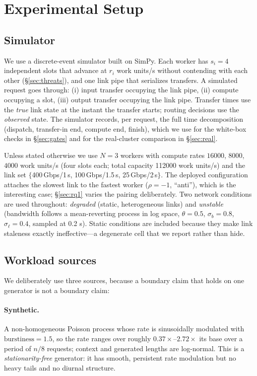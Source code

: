 \section{Experimental Setup}
\label{sec:setup}

\subsection{Simulator}
We use a discrete-event simulator built on SimPy. Each worker has $s_i=4$ independent slots that
advance at $r_i$ work units/s without contending with each other (\S\ref{sec:threats}), and one
link pipe that serializes transfers. A simulated request goes through: (i) input transfer
occupying the link pipe, (ii) compute occupying a slot, (iii) output transfer occupying the link
pipe. Transfer times use the \emph{true} link state at the instant the transfer starts; routing
decisions use the \emph{observed} state. The simulator records, per request, the full time
decomposition (dispatch, transfer-in end, compute end, finish), which we use for the white-box
checks in \S\ref{sec:gates} and for the real-cluster comparison in \S\ref{sec:real}.

Unless stated otherwise we use $N=3$ workers with compute rates $16000$, $8000$, $4000$ work
units/s (four slots each; total capacity 112000 work units/s) and the link set
$\{$400\,Gbps/1\,\textmu s, 100\,Gbps/1.5\,\textmu s, 25\,Gbps/2\,\textmu s$\}$. The deployed
configuration attaches the slowest link to the fastest worker ($\rho=-1$, ``anti''), which is the
interesting case; \S\ref{sec:rq1} varies the pairing deliberately. Two network conditions are used
throughout: \emph{degraded} (static, heterogeneous links) and \emph{unstable} (bandwidth follows a
mean-reverting process in log space, $\theta=0.5$, $\sigma_b=0.8$, $\sigma_\ell=0.4$, sampled at
0.2 s). Static conditions are included because they make link staleness exactly
ineffective---a degenerate cell that we report rather than hide.

\subsection{Workload sources}
We deliberately use three sources, because a boundary claim that holds on one generator is not a
boundary claim:

\paragraph{Synthetic.} A non-homogeneous Poisson process whose rate is sinusoidally modulated
with $\text{burstiness}=1.5$, so the rate ranges over roughly $0.37\times$--$2.72\times$ its base
over a period of $n/8$ requests; context and generated lengths are log-normal. This is a
\emph{stationarity-free} generator: it has smooth, persistent rate modulation but no heavy tails
and no diurnal structure.

